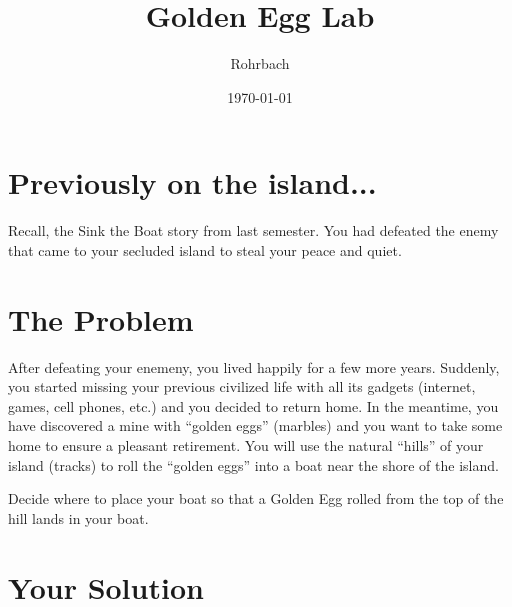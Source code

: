 \documentclass[10pt]{exam}
\title{Golden Egg Lab}
\author{Rohrbach}
\date{\today}
\begin{document}
\maketitle



\section*{Previously on the island...}

Recall, the Sink the Boat story from last semester.  You had defeated the enemy that came to your secluded island to steal your peace and quiet.


\section*{The Problem}

After defeating your enemeny, you lived happily for a few more years. Suddenly, you started missing your previous civilized life with all its gadgets (internet, games, cell phones, etc.) and you decided to return home. In the meantime, you have discovered a mine with ``golden eggs'' (marbles) and you want to take some home to ensure a pleasant retirement. You will use the natural ``hills'' of your island (tracks) to roll the ``golden eggs'' into a boat near the shore of the island. 

\vspace{2em}


\vspace{2em}

\noindent
Decide where to place your boat so that a Golden Egg rolled from the top of the hill lands in your boat.


\section*{Your Solution}
\end{document}

